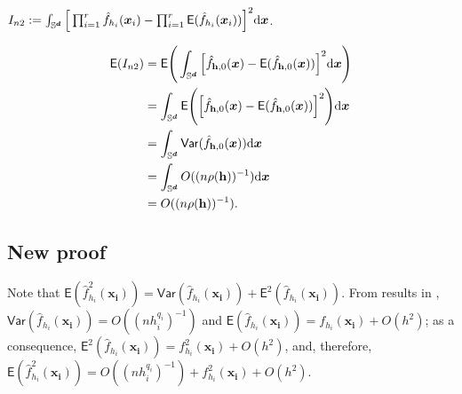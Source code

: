 \documentclass{article}
\begin{document}
$I_{n2} := \int_{\mathbb{S}^{\boldsymbol{d}}} \Big[ \prod_{i = 1}^{r} \hat{f}_{h_i}(\boldsymbol{x}_i) - \prod_{i = 1}^{r} \mathsf{E} (\hat{f}_{h_i} (\boldsymbol{x}_i)) \Big]^2 \mathrm{d} \boldsymbol{x}$.

\begin{align*}
    \mathsf{E} (I_{n2}) &= \mathsf{E} \Bigg( \int_{\mathbb{S}^{\boldsymbol{d}}} \Big[ \hat{f}_{\mathbf h,0}(\boldsymbol{x}) - \mathsf{E} (\hat{f}_{\mathbf h,0}(\boldsymbol{x})) \Big]^2 \mathrm{d} \boldsymbol{x} \Bigg) \\
    &= \int_{\mathbb{S}^{\boldsymbol{d}}} \mathsf{E} \Bigg( \Big[ \hat{f}_{\mathbf h,0}(\boldsymbol{x}) - \mathsf{E} (\hat{f}_{\mathbf h,0}(\boldsymbol{x})) \Big]^2 \Bigg) \mathrm{d} \boldsymbol{x} \\
    &= \int_{\mathbb{S}^{\boldsymbol{d}}} \mathsf{Var} (\hat{f}_{\mathbf h,0}(\boldsymbol{x})) \mathrm{d} \boldsymbol{x} \\
    &= \int_{\mathbb{S}^{\boldsymbol{d}}} O((n \rho(\mathbf h))^{-1}) \mathrm{d} \boldsymbol{x} \\
    &= O((n \rho(\mathbf h))^{-1}).
\end{align*}

\subsection{New proof}

Note that $\mathsf{E} (  \hat{f}_{h_i}^2(\mathbf{x_i}) ) = \mathsf{Var} (  \hat{f}_{h_i}(\mathbf{x_i}) ) + \mathsf{E}^2 (\hat{f}_{h_i} (\mathbf{x_i}))$. From results in \cite{Garc_a_Portugu_s_2013}, $\mathsf{Var} (  \hat{f}_{h_i}(\mathbf{x_i}) ) = O((nh_i^{q_i})^{-1})$ and $ \mathsf{E} (\hat{f}_{h_i} (\mathbf{x_i})) = f_{h_i} (\mathbf{x_i}) + O(h^2)$; as a consequence, $\mathsf{E}^2 (\hat{f}_{h_i} (\mathbf{x_i})) = f_{h_i}^2 (\mathbf{x_i}) + O(h^2)$, and, therefore, $\mathsf{E} (  \hat{f}_{h_i}^2(\mathbf{x_i}) ) = O((nh_i^{q_i})^{-1}) + f_{h_i}^2 (\mathbf{x_i}) + O(h^2)$.
\end{document}

